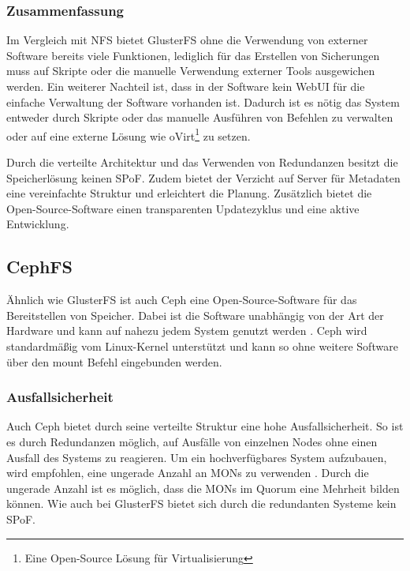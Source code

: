 \subsubsection{Zusammenfassung}
Im Vergleich mit \ac{NFS} bietet GlusterFS ohne die Verwendung von externer Software bereits viele Funktionen, lediglich für das Erstellen von Sicherungen muss auf Skripte oder die manuelle Verwendung externer Tools ausgewichen werden. Ein weiterer Nachteil ist, dass in der Software kein WebUI für die einfache Verwaltung der Software vorhanden ist. Dadurch ist es nötig das System entweder durch Skripte oder das manuelle Ausführen von Befehlen zu verwalten oder auf eine externe Lösung wie oVirt\footnote{Eine Open-Source Lösung für Virtualisierung} zu setzen. \medskip

Durch die verteilte Architektur und das Verwenden von Redundanzen besitzt die Speicherlösung keinen \ac{SPoF}. Zudem bietet der Verzicht auf Server für Metadaten eine vereinfachte Struktur und erleichtert die Planung.
Zusätzlich bietet die Open-Source-Software einen transparenten Updatezyklus und eine aktive Entwicklung.

\subsection{CephFS}
Ähnlich wie GlusterFS ist auch Ceph eine Open-Source-Software für das Bereitstellen von Speicher. Dabei ist die Software unabhängig von der Art der Hardware und kann auf nahezu jedem System genutzt werden \cite{cephcookbook}. Ceph wird standardmäßig vom Linux-Kernel unterstützt und kann so ohne weitere Software über den mount Befehl eingebunden werden.

\subsubsection{Ausfallsicherheit}
Auch Ceph bietet durch seine verteilte Struktur eine hohe Ausfallsicherheit. So ist es durch Redundanzen möglich, auf Ausfälle von einzelnen Nodes ohne einen Ausfall des Systems zu reagieren. Um ein hochverfügbares System aufzubauen, wird empfohlen, eine ungerade Anzahl an MONs zu verwenden \cite{cephcookbook}. Durch die ungerade Anzahl ist es möglich, dass die MONs im Quorum eine Mehrheit bilden können. Wie auch bei GlusterFS bietet sich durch die redundanten Systeme kein \ac{SPoF}.

